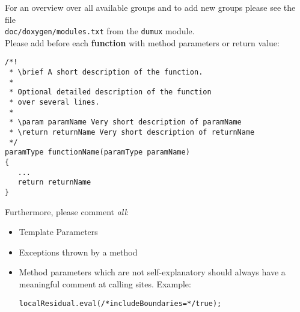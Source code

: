 For an overview over all available groups and to add new groups please
see the file\\ \texttt{doc/doxygen/modules.txt} from the \texttt{dumux} module.\\
Please add before each \textbf{function} with method parameters or return value:
\begin{lstlisting}[style=DumuxCode]
/*!
 * \brief A short description of the function. 
 *
 * Optional detailed description of the function
 * over several lines.
 *
 * \param paramName Very short description of paramName
 * \return returnName Very short description of returnName
 */
paramType functionName(paramType paramName)
{ 
   ...
   return returnName
}
\end{lstlisting}
Furthermore, please comment \textit{all}:
\begin{itemize}
  \item Template Parameters
  \item Exceptions thrown by a method
  \item Method parameters which are not self-explanatory should always
        have a meaningful comment at calling sites. Example:
  \begin{lstlisting}[style=DumuxCode]
    localResidual.eval(/*includeBoundaries=*/true);
  \end{lstlisting}
\end{itemize}

